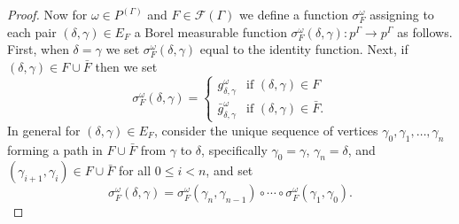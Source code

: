 \documentclass[12pt]{amsart}
\theoremstyle{definition}
\def\cal{\mathcal}
\begin{document}
\begin{proof}
	Now for $\omega \in P^{(\Gamma)}$ and $F \in \cal F(\Gamma)$ we define a function $\sigma_F^\omega$ assigning to each pair $(\delta, \gamma) \in E_F$ a Borel measurable function $\sigma_F^\omega(\delta, \gamma) : p^\Gamma \rightarrow p^\Gamma$ as follows. First, when $\delta = \gamma$ we set $\sigma_F^\omega(\delta, \gamma)$ equal to the identity function. Next, if $(\delta, \gamma) \in F \cup \bar F$ then we set
	\[\sigma_F^\omega(\delta, \gamma) = \begin{cases}
		g_{\delta, \gamma}^\omega & \text{if } (\delta, \gamma) \in F\\
		\bar g_{\delta, \gamma}^\omega & \text{if } (\delta, \gamma) \in \bar F.
	\end{cases}\]
	In general for $(\delta, \gamma) \in E_F$, consider the unique sequence of vertices $\gamma_0, \gamma_1, \ldots, \gamma_n$ forming a path in $F \cup \bar F$ from $\gamma$ to $\delta$, specifically $\gamma_0 = \gamma$, $\gamma_n = \delta$, and $(\gamma_{i+1}, \gamma_i) \in F \cup \bar F$ for all $0 \leq i < n$, and set
	\[\sigma_F^\omega(\delta, \gamma) = \sigma_F^\omega(\gamma_n, \gamma_{n-1}) \circ \cdots \circ \sigma_F^\omega(\gamma_1, \gamma_0).\]
	

\end{proof}
\end{document}
